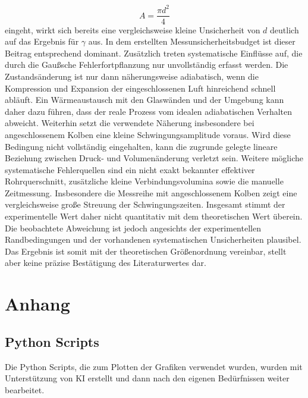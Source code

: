 \documentclass{report}
\begin{document}
\begin{equation}
A=\frac{\pi d^2}{4}
\end{equation}
\noindent
eingeht, wirkt sich bereits eine vergleichsweise kleine Unsicherheit von $d$
deutlich auf das Ergebnis für $\gamma$ aus. In dem erstellten
Messunsicherheitsbudget ist dieser Beitrag entsprechend dominant.
\noindent
Zusätzlich treten systematische Einflüsse auf, die durch die Gaußsche
Fehlerfortpflanzung nur unvollständig erfasst werden. Die Zustandsänderung ist
nur dann näherungsweise adiabatisch, wenn die Kompression und Expansion der
eingeschlossenen Luft hinreichend schnell abläuft. Ein Wärmeaustausch mit den
Glaswänden und der Umgebung kann daher dazu führen, dass der reale Prozess vom
idealen adiabatischen Verhalten abweicht.
\noindent
Weiterhin setzt die verwendete Näherung insbesondere bei angeschlossenem Kolben
eine kleine Schwingungsamplitude voraus. Wird diese Bedingung nicht vollständig
eingehalten, kann die zugrunde gelegte lineare Beziehung zwischen Druck- und
Volumenänderung verletzt sein.
\noindent
Weitere mögliche systematische Fehlerquellen sind ein nicht exakt bekannter
effektiver Rohrquerschnitt, zusätzliche kleine Verbindungsvolumina sowie die
manuelle Zeitmessung. Insbesondere die Messreihe mit angeschlossenem Kolben zeigt
eine vergleichsweise große Streuung der Schwingungszeiten.
\noindent
Insgesamt stimmt der experimentelle Wert daher nicht quantitativ mit dem
theoretischen Wert überein. Die beobachtete Abweichung ist jedoch angesichts der
experimentellen Randbedingungen und der vorhandenen systematischen
Unsicherheiten plausibel. Das Ergebnis ist somit mit der theoretischen
Größenordnung vereinbar, stellt aber keine präzise Bestätigung des
Literaturwertes dar.

\newpage
\chapter{Anhang}
\section{Python Scripts}
Die Python Scripts, die zum Plotten der Grafiken verwendet wurden, wurden mit Unterstützung von KI erstellt und dann nach den eigenen Bedürfnissen weiter
bearbeitet.

\end{document}
